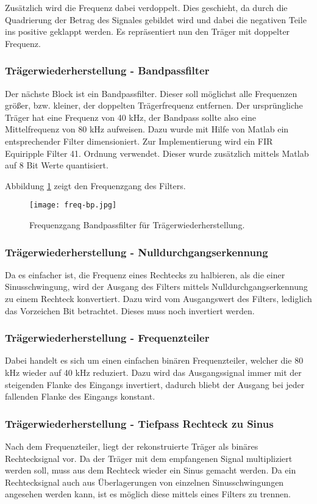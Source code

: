 Zusätzlich wird die Frequenz dabei verdoppelt. Dies geschieht, da durch die Quadrierung der Betrag des Signales gebildet wird und dabei die negativen Teile ins positive geklappt werden. Es repräsentiert nun den Träger mit doppelter Frequenz.

\subsubsection*{Trägerwiederherstellung - Bandpassfilter}
Der nächste Block ist ein Bandpassfilter. Dieser soll möglichst alle Frequenzen größer, bzw. kleiner, der doppelten Trägerfrequenz entfernen. Der ursprüngliche Träger hat eine Frequenz von 40 kHz, der Bandpass sollte also eine Mittelfrequenz von 80 kHz aufweisen. Dazu wurde mit Hilfe von Matlab ein entsprechender Filter dimensioniert. Zur Implementierung wird ein FIR Equiripple Filter 41. Ordnung verwendet. Dieser wurde zusätzlich mittels Matlab auf 8 Bit Werte quantisiert.

Abbildung \ref{fig:freq-bp} zeigt den Frequenzgang des Filters.

\begin{figure}[H]
\centering
\texttt{[image: freq-bp.jpg]}
\caption{Frequenzgang Bandpassfilter für Trägerwiederherstellung.}
\label{fig:freq-bp}
\end{figure}

\subsubsection*{Trägerwiederherstellung - Nulldurchgangserkennung}
Da es einfacher ist, die Frequenz eines Rechtecks zu halbieren, als die einer Sinusschwingung, wird der Ausgang des Filters mittels Nulldurchgangserkennung zu einem Rechteck konvertiert.
Dazu wird vom Ausgangswert des Filters, lediglich das Vorzeichen Bit betrachtet. Dieses muss noch invertiert werden.

\subsubsection*{Trägerwiederherstellung - Frequenzteiler}
Dabei handelt es sich um einen einfachen binären Frequenzteiler, welcher die 80 kHz wieder auf 40 kHz reduziert. Dazu wird das Ausgangssignal immer mit der steigenden Flanke des Eingangs invertiert, dadurch bliebt der Ausgang bei jeder fallenden Flanke des Eingangs konstant.

\subsubsection*{Trägerwiederherstellung - Tiefpass Rechteck zu Sinus}
Nach dem Frequenzteiler, liegt der rekonstruierte Träger als binäres Rechtecksignal vor. Da der Träger mit dem empfangenen Signal multipliziert werden soll, muss aus dem Rechteck wieder ein Sinus gemacht werden. Da ein Rechtecksignal auch aus Überlagerungen von einzelnen Sinusschwingungen angesehen werden kann, ist es möglich diese mittels eines Filters zu trennen. 


